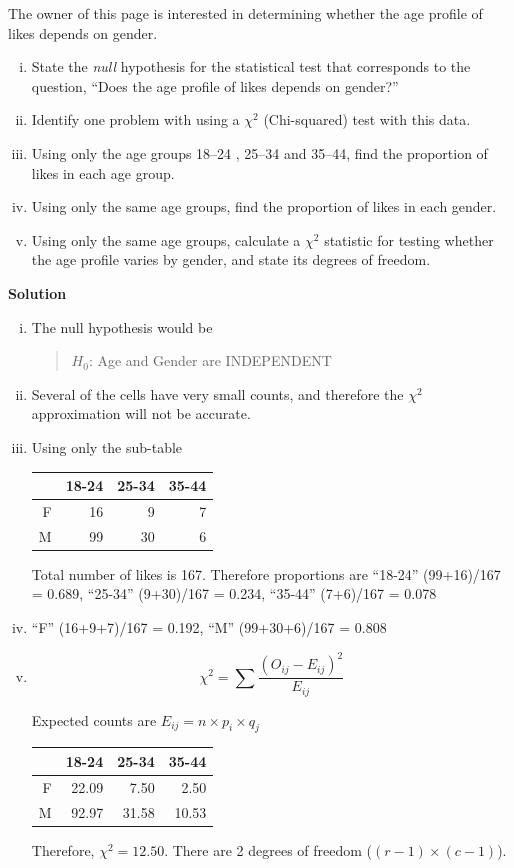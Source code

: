 \documentclass{uws_learning_guide}
\begin{document}
The owner of this page is interested in determining whether the age profile of likes depends on gender.

\begin{enumerate}[i)]
\item State the \emph{null} hypothesis for the statistical test that corresponds to the question, ``Does the age profile of likes depends on gender?''
\item Identify one problem with using a $\chi^2$ (Chi-squared) test with this data.
\item Using only the age groups 18--24 , 25--34  and 35--44, find the proportion of likes in each age group.
\item Using only the same age groups,  find the proportion of likes in each gender.
\item Using only the same age groups,  calculate a $\chi^2$ statistic for testing whether the age
  profile varies by gender, and state its degrees of freedom.
\end{enumerate}

{\bf Solution}

\begin{enumerate}[i)]
\item The null hypothesis would be 

\begin{quote}
$H_0$: Age and Gender are INDEPENDENT
\end{quote}
\item Several of the cells have very small counts, and therefore the
  $\chi^2$ approximation will not be accurate.
\item Using only the sub-table
\begin{center}
\begin{tabular}{rrrr}
  \toprule
 & 18-24 & 25-34 & 35-44 \\ 
  \midrule
F & 16 & 9 & 7 \\ 
  M & 99 & 30 & 6 \\ 
   \bottomrule
\end{tabular}
\end{center}
Total number of likes is 167. Therefore proportions are ``18-24''
(99+16)/167 = 0.689, ``25-34'' (9+30)/167 = 0.234, ``35-44''
(7+6)/167 = 0.078
\item ``F''  (16+9+7)/167 = 0.192, ``M'' (99+30+6)/167 = 0.808
\item \[
\chi^2 = \sum \frac{(O_{ij}-E_{ij})^2}{E_{ij}}\]

Expected counts are $E_{ij} = n\times p_i \times q_j$
\begin{center}
\begin{tabular}{rrrr}
  \toprule
 & 18-24 & 25-34 & 35-44 \\ 
  \midrule
F & 22.09 & 7.50 & 2.50 \\ 
  M & 92.97 & 31.58 & 10.53 \\ 
   \bottomrule
\end{tabular}
\end{center}

Therefore, $\chi^2 = 12.50$. There are 2 degrees of freedom
($(r-1)\times (c-1)$).
\end{enumerate}
\end{document}
